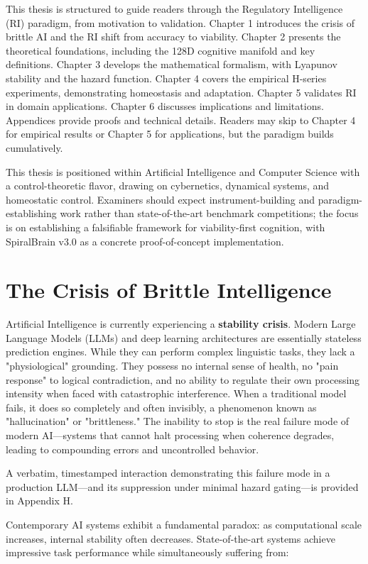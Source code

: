\documentclass[12pt,a4paper]{report}
\begin{document}
This thesis is structured to guide readers through the Regulatory Intelligence (RI) paradigm, from motivation to validation. Chapter 1 introduces the crisis of brittle AI and the RI shift from accuracy to viability. Chapter 2 presents the theoretical foundations, including the 128D cognitive manifold and key definitions. Chapter 3 develops the mathematical formalism, with Lyapunov stability and the hazard function. Chapter 4 covers the empirical H-series experiments, demonstrating homeostasis and adaptation. Chapter 5 validates RI in domain applications. Chapter 6 discusses implications and limitations. Appendices provide proofs and technical details. Readers may skip to Chapter 4 for empirical results or Chapter 5 for applications, but the paradigm builds cumulatively.

This thesis is positioned within Artificial Intelligence and Computer Science with a control-theoretic flavor, drawing on cybernetics, dynamical systems, and homeostatic control. Examiners should expect instrument-building and paradigm-establishing work rather than state-of-the-art benchmark competitions; the focus is on establishing a falsifiable framework for viability-first cognition, with SpiralBrain v3.0 as a concrete proof-of-concept implementation.

\section{The Crisis of Brittle Intelligence}

Artificial Intelligence is currently experiencing a \textbf{stability crisis}. Modern Large Language Models (LLMs) and deep learning architectures are essentially stateless prediction engines. While they can perform complex linguistic tasks, they lack a "physiological" grounding. They possess no internal sense of health, no "pain response" to logical contradiction, and no ability to regulate their own processing intensity when faced with catastrophic interference. When a traditional model fails, it does so completely and often invisibly, a phenomenon known as "hallucination" or "brittleness." The inability to stop is the real failure mode of modern AI—systems that cannot halt processing when coherence degrades, leading to compounding errors and uncontrolled behavior.

A verbatim, timestamped interaction demonstrating this failure mode in a production LLM—and its suppression under minimal hazard gating—is provided in Appendix H.

Contemporary AI systems exhibit a fundamental paradox: as computational scale increases, internal stability often decreases. State-of-the-art systems achieve impressive task performance while simultaneously suffering from:
\end{document}
